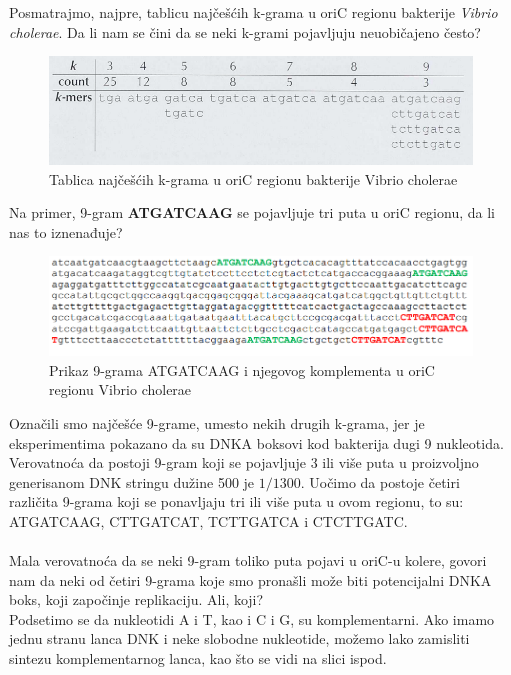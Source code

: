Posmatrajmo, najpre, tablicu najčešćih k-grama u oriC regionu bakterije \textit{Vibrio cholerae}. Da li nam se čini da se neki k-grami pojavljuju neuobičajeno često? 

\begin{figure}[h]
\caption{Tablica najčešćih k-grama u oriC regionu bakterije Vibrio cholerae}
\centering
\includegraphics[width=1\textwidth]{poglavlja/1/slike/Tablica_VC.png}
\end{figure} 

Na primer, 9-gram \textbf{ATGATCAAG} se pojavljuje tri puta u oriC regionu, da li nas to iznenađuje?

\begin{figure}[h]
\caption{Prikaz 9-grama ATGATCAAG i njegovog komplementa u oriC regionu Vibrio cholerae}
\centering
\includegraphics[width=1\textwidth]{poglavlja/1/slike/9_VC.png}
\end{figure} 

Označili smo najčešće 9-grame, umesto nekih drugih k-grama, jer je eksperimentima pokazano da su DNKA boksovi kod bakterija dugi 9 nukleotida. Verovatnoća da postoji 9-gram koji se pojavljuje 3 ili više puta u proizvoljno generisanom DNK stringu dužine 500 je $1/1300$. Uočimo da postoje četiri različita 9-grama koji se ponavljaju tri ili više puta u ovom regionu, to su: ATGATCAAG, CTTGATCAT, TCTTGATCA i CTCTTGATC.\\\\

Mala verovatnoća da se neki 9-gram toliko puta pojavi u oriC-u kolere, govori nam da neki od četiri 9-grama koje smo pronašli može biti potencijalni DNKA boks, koji započinje replikaciju. Ali, koji?\\

Podsetimo se da nukleotidi A i T, kao i C i G, su komplementarni. Ako imamo jednu stranu lanca DNK i neke slobodne nukleotide, možemo lako zamisliti sintezu komplementarnog lanca, kao što se vidi na slici ispod. 

